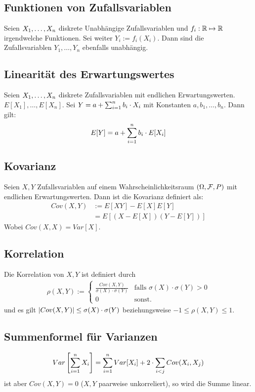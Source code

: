 \subsection*{Funktionen von Zufallsvariablen}
Seien $X_1, \dots, X_n$ diskrete Unabhängige Zufallsvariablen und $f_i: \mathbb{R}
  \mapsto \mathbb{R}$ irgendwelche Funktionen. Sei weiter $Y_i := f_i (X_i)$. Dann sind
die Zufallsvariablen $Y_1, \dots, Y_n$ ebenfalls unabhängig.
\subsection*{Linearität des Erwartungswertes}
Seien $X_1, \dots, X_n$ diskrete Zufallsvariablen mit endlichen
Erwartungswerten. $E[X_1], \dots, E[X_n]$. Sei $Y = a + \sum_{i = 1}^n b_i \cdot X_i$ mit
Konstanten $a, b_1, \dots, b_n$. Dann gilt:
\begin{align*}
  E[Y] = a + \sum_{i = 1}^n b_i \cdot E[X_i]
\end{align*}
\subsection*{Kovarianz}
Seien $X, Y$ Zufallsvariablen auf einem Wahrscheinlichkeitsraum $ (\Omega, \mathcal{F},
  P)$ mit endlichen Erwartungswerten. Dann ist die Kovarianz definiert als:
\begin{align*}
  Cov (X, Y) & := E[XY] - E[X]E[Y]          \\
             & = E[ (X - E[X])  (Y - E[Y])]
\end{align*}
Wobei $Cov (X, X) = Var[X]$.
\subsection*{Korrelation}
Die Korrelation von $X, Y$ ist definiert durch
\begin{align*}
  \rho (X, Y) := \begin{cases}
                   \frac{Cov (X, Y)}{\sigma (X) \cdot \sigma (Y)} & \text{falls } \sigma (X) \cdot \sigma (Y) > 0 \\
                   0                                              & \text{sonst.}
                 \end{cases}
\end{align*}
und es gilt $\abs{Cov (X, Y)} \leq \sigma (X) \cdot \sigma (Y)$
beziehungsweise $-1 \leq \rho (X, Y) \leq 1$.
\subsection*{Summenformel für Varianzen}
\begin{align*}
  Var \left[ \sum_{i = 1}^n X_i \right] = \sum_{i = 1}^n Var[X_i] + 2 \cdot \sum_{i < j} Cov (X_i, X_j)
\end{align*}
ist aber $Cov (X, Y) = 0$  ($X, Y$ paarweise unkorreliert), so wird
die Summe linear.

